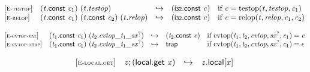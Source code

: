 \vspace{1ex}

$$
\begin{array}{@{}l@{}lcl@{}l@{}}
{[\textsc{\scriptsize E{-}testop}]} \quad & ({\mathit{t}}.\mathsf{const}~{\mathit{c}}_{{1}})~({\mathit{t}} . {\mathit{testop}}) &\hookrightarrow& (\mathsf{i{\scriptstyle32}}.\mathsf{const}~{\mathit{c}}) &\quad
  \mbox{if}~{\mathit{c}} = {\mathrm{testop}}({\mathit{t}}, {\mathit{testop}}, {\mathit{c}}_{{1}}) \\
{[\textsc{\scriptsize E{-}relop}]} \quad & ({\mathit{t}}.\mathsf{const}~{\mathit{c}}_{{1}})~({\mathit{t}}.\mathsf{const}~{\mathit{c}}_{{2}})~({\mathit{t}} . {\mathit{relop}}) &\hookrightarrow& (\mathsf{i{\scriptstyle32}}.\mathsf{const}~{\mathit{c}}) &\quad
  \mbox{if}~{\mathit{c}} = {\mathrm{relop}}({\mathit{t}}, {\mathit{relop}}, {\mathit{c}}_{{1}}, {\mathit{c}}_{{2}}) \\
\end{array}
$$

\vspace{1ex}

$$
\begin{array}{@{}l@{}lcl@{}l@{}}
{[\textsc{\scriptsize E{-}cvtop{-}val}]} \quad & ({\mathit{t}}_{{1}}.\mathsf{const}~{\mathit{c}}_{{1}})~({\mathit{t}}_{{2}} . {{{{{\mathit{cvtop}}}{\mathsf{\_}}}{{\mathit{t}}_{{1}}}}{\mathsf{\_}}}{{{\mathit{sx}}^?}}) &\hookrightarrow& ({\mathit{t}}_{{2}}.\mathsf{const}~{\mathit{c}}) &\quad
  \mbox{if}~{\mathrm{cvtop}}({\mathit{t}}_{{1}}, {\mathit{t}}_{{2}}, {\mathit{cvtop}}, {{\mathit{sx}}^?}, {\mathit{c}}_{{1}}) = {\mathit{c}} \\
{[\textsc{\scriptsize E{-}cvtop{-}trap}]} \quad & ({\mathit{t}}_{{1}}.\mathsf{const}~{\mathit{c}}_{{1}})~({\mathit{t}}_{{2}} . {{{{{\mathit{cvtop}}}{\mathsf{\_}}}{{\mathit{t}}_{{1}}}}{\mathsf{\_}}}{{{\mathit{sx}}^?}}) &\hookrightarrow& \mathsf{trap} &\quad
  \mbox{if}~{\mathrm{cvtop}}({\mathit{t}}_{{1}}, {\mathit{t}}_{{2}}, {\mathit{cvtop}}, {{\mathit{sx}}^?}, {\mathit{c}}_{{1}}) = \epsilon \\
\end{array}
$$

\vspace{1ex}

$$
\begin{array}{@{}l@{}lcl@{}l@{}}
{[\textsc{\scriptsize E{-}local.get}]} \quad & {\mathit{z}} ; (\mathsf{local.get}~{\mathit{x}}) &\hookrightarrow& {{\mathit{z}}.\mathsf{local}}{[{\mathit{x}}]} &  \\
\end{array}
$$

